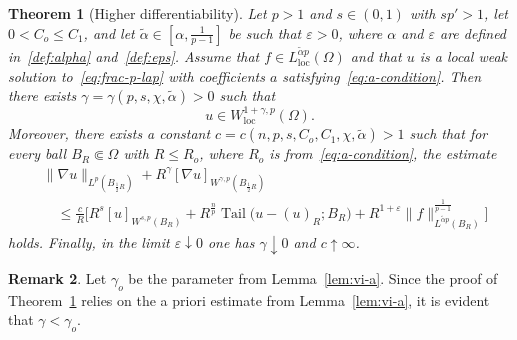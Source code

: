 \documentclass[10pt,letterpaper]{amsart}
\newtheorem{theorem}{Theorem}
\theoremstyle{definition}
\newtheorem{remark}[theorem]{Remark}
\numberwithin{theorem}{section}
\numberwithin{equation}{section}
\newcommand{\1}{\ensuremath{\mathds{1}}}
\renewcommand{\epsilon}{\varepsilon}
\renewcommand{\epsilon}{\varepsilon}
\DeclareMathOperator{\Tail}{Tail}
\numberwithin{equation}{section}
\begin{document}
\begin{theorem}[Higher differentiability]\label{thm:higher-diff-2}
Let $p>1$ and $s\in(0,1)$ with $sp'>1$, let $0<C_o\le C_1$, and let $\tilde\alpha\in[\alpha,\frac{1}{p-1}]$ be such that $\epsilon>0$, where $\alpha$ and $\epsilon$ are defined in~\eqref{def:alpha} and~\eqref{def:eps}.
Assume that $f\in L^{\tilde{\alpha}p}_{\mathrm{loc}}(\Omega)$ and that
$u$ is a local weak solution to~\eqref{eq:frac-p-lap} with coefficients
$a$ satisfying~\eqref{eq:a-condition}.
Then there exists
\(
\gamma=\gamma(p,s,\chi,\tilde\alpha)>0
\)
such that
\[
u\in W^{1+\gamma,p}_{\mathrm{loc}}(\Omega).
\]
Moreover, there exists a constant
$c=c(n,p,s,C_o,C_1,\chi,\tilde\alpha)>1$ such that for every ball
$B_R\Subset\Omega$ with $R\le R_o$,  where $R_o$ is from~\eqref{eq:a-condition}, the estimate
\begin{align*}
    &\|\nabla u\|_{L^p(B_{\frac12 R})}
    + R^\gamma [\nabla u]_{W^{\gamma,p}(B_{\frac12 R})} \\
    &\quad\le
    \frac{c}{R}
    \bigg[
        R^s [u]_{W^{s,p}(B_R)}
        + R^{\frac{n}{p}}
        \Tail\big(u-(u)_{R}; B_R\big)
        + R^{1+\varepsilon}
        \|f\|_{L^{\tilde{\alpha}p}(B_R)}^{\frac{1}{p-1}}
    \bigg]
\end{align*}
holds.
Finally, in the limit $\epsilon\downarrow0$ one has
$\gamma\downarrow0$ and $c\uparrow\infty$.
\end{theorem}

\begin{remark}\label{rem:go}
Let $\gamma_o$ be the parameter from Lemma~\ref{lem:vi-a}. 
Since the proof of Theorem~\ref{thm:higher-diff-2} relies on the a priori estimate from Lemma~\ref{lem:vi-a}, it is evident that $\gamma < \gamma_o$.
\end{remark}
\end{document}
